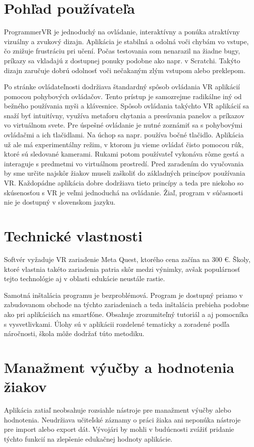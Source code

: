 \documentclass[a4paper,12pt]{article}
\begin{document}
\section{Pohľad používateľa}
ProgrammerVR je jednoduchý na ovládanie, interaktívny a ponúka atraktívny vizuálny a zvukový dizajn.
Aplikácia je stabilná a odolná voči chybám vo vstupe, čo znižuje frustráciu pri učení.
Počas testovania som nenarazil na žiadne bugy, príkazy sa vkladajú z dostupnej ponuky podobne ako napr.
v Scratchi. Takýto dizajn zaručuje dobrú odolnosť voči nečakaným zlým vstupom alebo preklepom.


Po stránke ovládateľnosti dodržiava štandardný spôsob ovládania VR aplikácií pomocou pohybových ovládačov.
Tento prístup je samozrejme radikálne iný od bežného používania myši a klávesnice.
Spôsob ovládania takýchto VR aplikácií sa snaží byť intuitívny, využíva metaforu chytania a presúvania
panelov a príkazov vo virtuálnom svete. Pre úspešné ovládanie je nutné zoznámiť sa s pohybovými ovládačmi
a ich tlačidlami. Na úchop sa napr. používa bočné tlačidlo. Aplikácia už ale má experimentálny režim,
v ktorom ju vieme ovládať čisto pomocou rúk, ktoré sú sledované kamerami. Rukami potom používateľ vykonáva
rôzne gestá a interaguje s predmetmi vo virtuálnom prostredí. Pred zaradením do vyučovania by sme určite
najskôr žiakov museli zaškoliť do základných princípov používania VR. Každopádne aplikácia dobre dodržiava
tieto princípy a teda pre niekoho so skúsenosťou s VR je veľmi jednoduchá na ovládanie.
Žiaľ, program v súčasnosti nie je dostupný v slovenskom jazyku.


\section{Technické vlastnosti}
Softvér vyžaduje VR zariadenie Meta Quest, ktorého cena začína na 300 \euro{}.
Školy, ktoré vlastnia takéto zariadenia patria skôr medzi výnimky, avšak populárnosť tejto technológie
aj v oblasti edukácie neustále rastie.


Samotná inštalácia programu je bezproblémová.
Program je dostupný priamo v zabudovanom obchode na týchto zariadeniach
a teda inštalácia prebieha podobne ako pri aplikáciách na smartfóne. Obsahuje zrozumiteľný
tutoriál a aj pomocníka s vysvetlivkami.
Úlohy sú v aplikácii rozdelené tematicky a zoradené podľa náročnosti, škola môže dodržať túto metodiku.


\section{Manažment výučby a hodnotenia žiakov}
Aplikácia zatiaľ neobsahuje rozsiahle nástroje pre manažment výučby alebo hodnotenia.
Neudržiava učiteľské záznamy o práci žiaka ani neponúka nástroje pre import alebo export dát.
Vývojári by mohli v budúcnosti zvážiť pridanie týchto funkcií na zlepšenie edukačnej hodnoty aplikácie.
\end{document}
